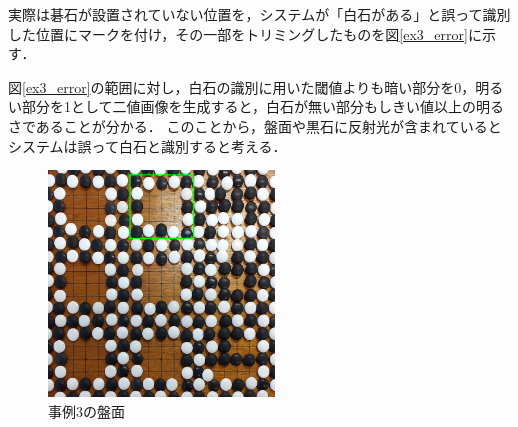 \documentclass[openright]{nitocs}
\numberwithin{equation}{section}
\begin{document}
                実際は碁石が設置されていない位置を，システムが「白石がある」と誤って識別した位置にマークを付け，その一部をトリミングしたものを図\ref{ex3_error}に示す．

                図\ref{ex3_error}の範囲に対し，白石の識別に用いた閾値よりも暗い部分を0，明るい部分を1として二値画像を生成すると，白石が無い部分もしきい値以上の明るさであることが分かる．
                このことから，盤面や黒石に反射光が含まれているとシステムは誤って白石と識別すると考える．
                \begin{figure}[tb] %
                    \begin{center}
                    \includegraphics[clip,width=60mm]{DSC_0098/boardImg.jpg} 
                    \caption{事例3の盤面}
                    \label{ex3_img}
                    \end{center}
                \end{figure}
\end{document}
